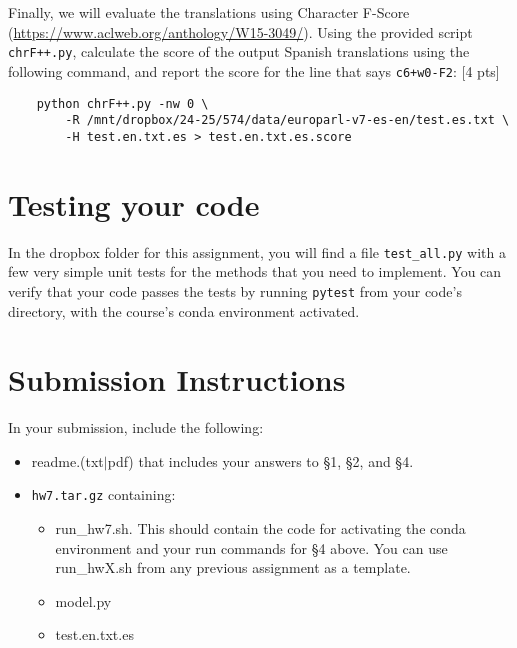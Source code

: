 \documentclass[11pt]{article}
\begin{document}
\vspace{2em}
 Finally, we will evaluate the translations using Character F-Score (\url{https://www.aclweb.org/anthology/W15-3049/}). Using the provided script \texttt{chrF++.py}, calculate the score of the output Spanish translations using the following command, and report the score for the line that says \texttt{c6+w0-F2}: \hfill [4 pts]
\begin{lstlisting}
    python chrF++.py -nw 0 \ 
        -R /mnt/dropbox/24-25/574/data/europarl-v7-es-en/test.es.txt \
        -H test.en.txt.es > test.en.txt.es.score
\end{lstlisting}

\section{Testing your code}

In the dropbox folder for this assignment, you will find a file \texttt{test\_all.py} with a few very simple unit tests for the methods that you need to implement.  You can verify that your code passes the tests by running \texttt{pytest} from your code's directory, with the course's conda environment activated.


\section*{Submission Instructions}

In your submission, include the following:
\begin{itemize}
  \item readme.(txt$\mid$pdf) that includes your answers to \S1, \S2, and \S4. 
  \item \texttt{hw7.tar.gz} containing:
  \begin{itemize}
    \item run\_hw7.sh.  This should contain the code for activating the conda environment and your run commands for \S4 above.  You can use run\_hwX.sh from any previous assignment as a template.
    \item model.py
    \item test.en.txt.es
    \end{itemize}
\end{itemize}
\end{document}
